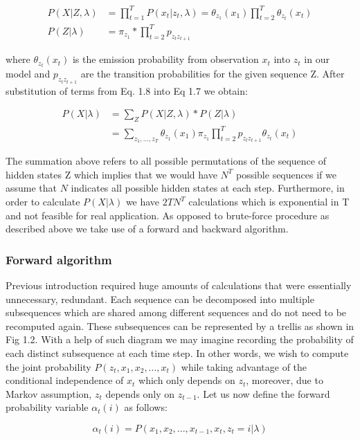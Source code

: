 \begin{align}
P(X| Z, \lambda) &= \prod_{t=1}^T  P(x_t|z_t,\lambda) = \theta_{z_1}(x_1) \prod_{t=2}^T \theta_{z_t}(x_t) \\ \nonumber
P(Z|\lambda)&= \pi_{z_1} * \prod_{t=2}^{T} p_{z_t z_{t+1}}
\end{align}

where $\theta_{z_t}(x_t)$ is the emission probability from observation $x_t$ into $z_t$ in our model and $p_{z_t z_{t+1}}$ are the transition probabilities for the given sequence Z. After substitution of terms from Eq. 1.8 into Eq 1.7 we obtain:

\begin{align}
P(X| \lambda) &= \sum_Z P(X|Z,\lambda)*P(Z|\lambda) \\ \nonumber
&= \sum_{z_1,...,z_T}\theta_{z_1}(x_1) \pi_{z_1} \prod_{t=2}^{T} p_{z_t z_{t+1}} \theta_{z_t}(x_t)
\end{align}

The summation above refers to all possible permutations of the sequence of hidden states Z which implies that we would have $N^T$ possible sequences if we assume that $N$ indicates all possible hidden states at each step. Furthermore, in order to calculate $P(X|\lambda)$ we have $2TN^T$ calculations which is exponential in T and not feasible for real application. As opposed to brute-force procedure as described above we take use of a forward and backward algorithm. 

\subsubsection{Forward algorithm}

Previous introduction required huge amounts of calculations that were essentially unnecessary, redundant. Each sequence can be decomposed into multiple subsequences which are shared among different sequences and do not need to be recomputed again. These subsequences can be represented by a trellis as shown in Fig 1.2. With a help of such diagram we may imagine recording the probability of each distinct subsequence at each time step. In other words, we wish to compute the joint probability $P(z_t,x_1,x_2,...,x_t)$ while taking advantage of the conditional independence of $x_t$ which only depends on $z_t$, moreover, due to Markov assumption, $z_t$ depends only on $z_{t-1}$. Let us now define the forward probability variable $\alpha_t(i)$ as follows:

 \begin{equation}
\alpha_t(i) = P(x_1,x_2,...,x_{t-1},x_t,z_t=i |\lambda)
\end{equation}

